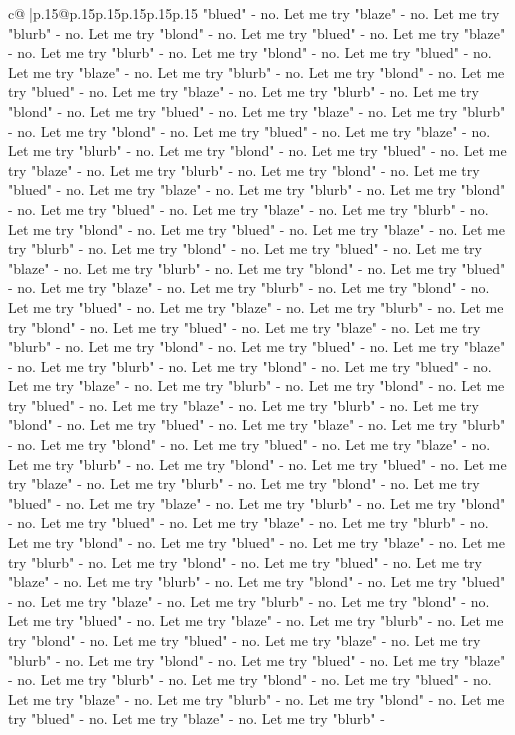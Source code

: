 \documentclass{article}
\begin{document}
{\begin{supertabular}{c@{$\;$}|p{.15\linewidth}@{}p{.15\linewidth}p{.15\linewidth}p{.15\linewidth}p{.15\linewidth}p{.15\linewidth}}
{{{"blued" {-} no. Let me try "blaze" {-} no. Let me try "blurb" {-} no. Let me try "blond" {-} no. Let me try "blued" {-} no. Let me try "blaze" {-} no. Let me try "blurb" {-} no. Let me try "blond" {-} no. Let me try "blued" {-} no. Let me try "blaze" {-} no. Let me try "blurb" {-} no. Let me try "blond" {-} no. Let me try "blued" {-} no. Let me try "blaze" {-} no. Let me try "blurb" {-} no. Let me try "blond" {-} no. Let me try "blued" {-} no. Let me try "blaze" {-} no. Let me try "blurb" {-} no. Let me try "blond" {-} no. Let me try "blued" {-} no. Let me try "blaze" {-} no. Let me try "blurb" {-} no. Let me try "blond" {-} no. Let me try "blued" {-} no. Let me try "blaze" {-} no. Let me try "blurb" {-} no. Let me try "blond" {-} no. Let me try "blued" {-} no. Let me try "blaze" {-} no. Let me try "blurb" {-} no. Let me try "blond" {-} no. Let me try "blued" {-} no. Let me try "blaze" {-} no. Let me try "blurb" {-} no. Let me try "blond" {-} no. Let me try "blued" {-} no. Let me try "blaze" {-} no. Let me try "blurb" {-} no. Let me try "blond" {-} no. Let me try "blued" {-} no. Let me try "blaze" {-} no. Let me try "blurb" {-} no. Let me try "blond" {-} no. Let me try "blued" {-} no. Let me try "blaze" {-} no. Let me try "blurb" {-} no. Let me try "blond" {-} no. Let me try "blued" {-} no. Let me try "blaze" {-} no. Let me try "blurb" {-} no. Let me try "blond" {-} no. Let me try "blued" {-} no. Let me try "blaze" {-} no. Let me try "blurb" {-} no. Let me try "blond" {-} no. Let me try "blued" {-} no. Let me try "blaze" {-} no. Let me try "blurb" {-} no. Let me try "blond" {-} no. Let me try "blued" {-} no. Let me try "blaze" {-} no. Let me try "blurb" {-} no. Let me try "blond" {-} no. Let me try "blued" {-} no. Let me try "blaze" {-} no. Let me try "blurb" {-} no. Let me try "blond" {-} no. Let me try "blued" {-} no. Let me try "blaze" {-} no. Let me try "blurb" {-} no. Let me try "blond" {-} no. Let me try "blued" {-} no. Let me try "blaze" {-} no. Let me try "blurb" {-} no. Let me try "blond" {-} no. Let me try "blued" {-} no. Let me try "blaze" {-} no. Let me try "blurb" {-} no. Let me try "blond" {-} no. Let me try "blued" {-} no. Let me try "blaze" {-} no. Let me try "blurb" {-} no. Let me try "blond" {-} no. Let me try "blued" {-} no. Let me try "blaze" {-} no. Let me try "blurb" {-} no. Let me try "blond" {-} no. Let me try "blued" {-} no. Let me try "blaze" {-} no. Let me try "blurb" {-} no. Let me try "blond" {-} no. Let me try "blued" {-} no. Let me try "blaze" {-} no. Let me try "blurb" {-} no. Let me try "blond" {-} no. Let me try "blued" {-} no. Let me try "blaze" {-} no. Let me try "blurb" {-} no. Let me try "blond" {-} no. Let me try "blued" {-} no. Let me try "blaze" {-} no. Let me try "blurb" {-} no. Let me try "blond" {-} no. Let me try "blued" {-} no. Let me try "blaze" {-} no. Let me try "blurb" {-} no. Let me try "blond" {-} no. Let me try "blued" {-} no. Let me try "blaze" {-} no. Let me try "blurb" {-} no. Let me try "blond" {-} no. Let me try "blued" {-} no. Let me try "blaze" {-} no. Let me try "blurb" {-} no. Let me try "blond" {-} no. Let me try "blued" {-} no. Let me try "blaze" {-} no. Let me try "blurb" {-} }}}
\end{supertabular}}
\end{document}
